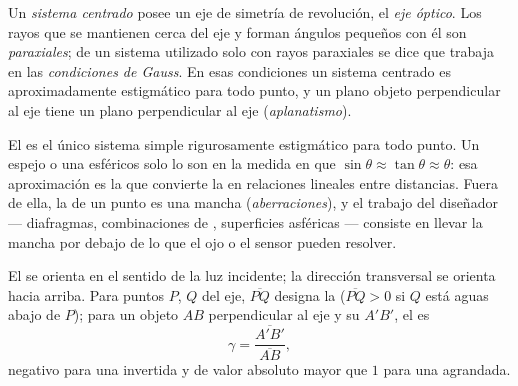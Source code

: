 \begin{definition}\label{def:b1:mirrors-thin-lenses:gauss}
Un \emph{sistema centrado} posee un eje de simetría de revolución, el
\emph{eje óptico}. Los rayos que se mantienen cerca del eje y forman
ángulos pequeños con él son \emph{paraxiales}; de un sistema utilizado
solo con rayos paraxiales se dice que trabaja en las \emph{condiciones de
Gauss}. En esas condiciones un sistema centrado es aproximadamente
estigmático para todo punto, y un plano objeto perpendicular al eje tiene
un plano  perpendicular al eje (\emph{aplanatismo}).
\end{definition}
\admitted

\begin{remark}\label{rem:b1:mirrors-thin-lenses:why}
El  es el único sistema simple rigurosamente estigmático para
todo punto. Un espejo o una  esféricos solo lo son en la medida en
que $\sin\theta \approx \tan\theta \approx \theta$: esa aproximación es la
que convierte la  en relaciones lineales entre distancias.
Fuera de ella, la  de un punto es una mancha (\emph{aberraciones}),
y el trabajo del diseñador --- diafragmas, combinaciones de ,
superficies asféricas --- consiste en llevar la mancha por debajo de lo
que el ojo o el sensor pueden resolver.
\end{remark}

\begin{notation}\label{not:b1:mirrors-thin-lenses:signs}
El  se orienta en el sentido de la luz incidente; la dirección
transversal se orienta hacia arriba. Para puntos $P$, $Q$ del eje,
$\overline{PQ}$ designa la  ($\overline{PQ} > 0$ si $Q$
está aguas abajo de $P$); para un objeto $AB$ perpendicular al eje y su
 $A'B'$, el \emph{} es
\[
\gamma = \frac{\overline{A'B'}}{\overline{AB}} ,
\]
negativo para una  invertida y de valor absoluto mayor que $1$ para
una  agrandada.
\end{notation}

